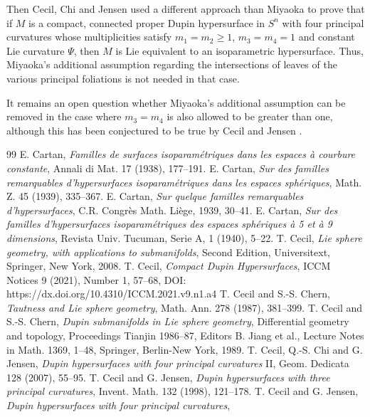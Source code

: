 \documentclass[12pt]{article}
\begin{document}
Then Cecil, Chi and Jensen \cite{CCJ2} used a different approach than Miyaoka
to prove that if $M$ is a
compact, connected proper Dupin hypersurface in $S^n$ with four principal curvatures whose multiplicities
satisfy $m_1 = m_2 \geq 1$, $m_3 = m_4 =1$ and constant Lie curvature $\Psi$, then $M$ is Lie equivalent to an 
isoparametric hypersurface.  Thus, Miyaoka's additional assumption regarding the intersections
of leaves of the various principal foliations is not needed in that case.  

It remains an open question whether
Miyaoka's additional assumption can be removed in the case where $m_3 = m_4$ is also allowed to be greater than one,
although this has been conjectured to be true by 
Cecil and Jensen \cite[pp. 3--4]{CJ3}.




\begin{thebibliography}{99}
 E. Cartan, {\em Familles de surfaces 
isoparam\'{e}triques dans les espaces \`{a} courbure constante},
Annali di Mat. 17 (1938), 177--191.
 E. Cartan,
{\em Sur des familles remarquables d'hypersurfaces
isoparam\'{e}triques dans les espaces sph\'{e}riques},
Math. Z. 45 (1939), 335--367.
 E. Cartan,
{\em Sur quelque familles remarquables d'hypersurfaces}, 
C.R. Congr\`{e}s Math. Li\`{e}ge, 1939, 30--41.
 E. Cartan, {\em Sur des 
familles d'hypersurfaces isoparam\'{e}triques des espaces 
sph\'{e}riques \`{a} 5 et \`{a} 9 dimensions}, Revista Univ. Tucuman, Serie A, 1 (1940), 5--22.
 T. Cecil, {\em Lie sphere geometry, with applications to submanifolds}, Second Edition, 
Universitext, Springer, New York, 2008.
 T. Cecil, {\em Compact Dupin Hypersurfaces}, ICCM Notices 9 (2021), Number 1, 57--68,
DOI: https://dx.doi.org/10.4310/ICCM.2021.v9.n1.a4 
 T. Cecil and S.-S. Chern, {\em Tautness and
Lie sphere geometry}, Math. Ann. 278 (1987), 381--399. 
 T. Cecil and S.-S. Chern, {\em Dupin submanifolds in Lie sphere geometry}, Differential geometry and topology, Proceedings Tianjin 1986--87, Editors B. Jiang et al.,
Lecture Notes in Math. 1369, 1--48, Springer, Berlin-New York, 1989.
 T. Cecil, Q.-S. Chi and G. Jensen, {\em Dupin hypersurfaces with four principal curvatures} II, 
Geom. Dedicata 128 (2007), 55--95.
 T. Cecil and G. Jensen, {\em Dupin hypersurfaces with three principal curvatures}, 
Invent. Math. 132 (1998), 121--178.
 T. Cecil and G. Jensen, {\em Dupin hypersurfaces with four principal curvatures}, 

\end{thebibliography}
\end{document}
